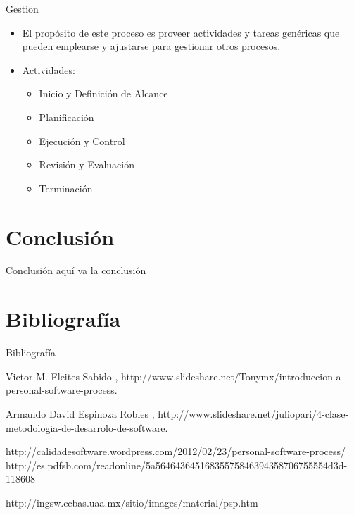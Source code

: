 \documentclass{beamer}
\begin{document}
			\begin{frame}{Gestion}
				\begin{itemize}
					\item El propósito de este proceso es proveer actividades y tareas genéricas que pueden emplearse y ajustarse para gestionar otros procesos.
					\item Actividades:
					
					\begin{itemize}
						\item Inicio y Definición de Alcance
						\item Planificación
						\item Ejecución y Control
						\item Revisión y Evaluación
						\item Terminación
					\end{itemize}
				\end{itemize}
			\end{frame}
			
			
			
\section{Conclusi\'on}
	\begin{frame}{Conclusión}
		aqu\'i va la conclusi\'on
	\end{frame}				
			
\section{Bibliograf\'ia}
	\begin{frame}{Bibliograf\'ia}
		\begin{thebibliography}{9}
		
 			Victor M. Fleites Sabido 
 			, 
 			\newblock http://www.slideshare.net/Tonymx/introduccion-a-personal-software-process.
		
 			Armando David Espinoza Robles
 			, 
 			\newblock http://www.slideshare.net/juliopari/4-clase-metodologia-de-desarrolo-de-software.
 			
		http://calidadesoftware.wordpress.com/2012/02/23/personal-software-process/ 			
		http://es.pdfsb.com/readonline/5a56464364516835575846394358706755554d3d-118608
 			
 		http://ingsw.ccbas.uaa.mx/sitio/images/material/psp.htm
		\end{thebibliography}
	\end{frame}
\end{document}
